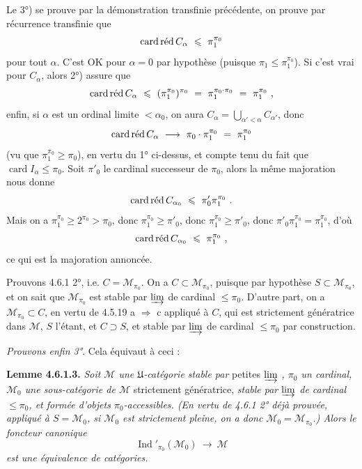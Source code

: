 \documentclass[11pt]{article}
\newcommand{\printedpage}[1]{\marginpar{\footnotesize p.~#1}}
\newcommand{\msp}[1]{\marginpar{\footnotesize [#1]}}
\newcommand{\Ind}{\operatorname{Ind}}
\newcommand{\cardred}{\mathop{\mathrm{card}\,\textup{réd}}\nolimits}
\begin{document}
Le 3°) se prouve par la démonstration transfinie précédente, on prouve par récurrence transfinie que
\[
\cardred C_\alpha \ \leqslant\ \pi_1^{\pi_0}
\]
pour tout $\alpha$. C'est OK pour $\alpha=0$ par hypothèse (puisque $\pi_1\leqslant\pi_1^{\pi_0}$). Si c'est vrai pour $C_\alpha$, alors 2°) assure que
\[
\cardred C_\alpha \ \leqslant\ (\pi_1^{\pi_0})^{\pi_0} \ =\ \pi_1^{\pi_0\cdot\pi_0} \ =\ \pi_1^{\pi_0}\ , %
\]
enfin, si $\alpha$ est un ordinal limite $<\alpha_0$, on aura $C_\alpha=\bigcup_{\alpha'<\alpha}C_{\alpha'}$, donc
\[
\cardred C_\alpha \ \longrightarrow\ \pi_0\cdot\pi_1^{\pi_0} \ =\ \pi_1^{\pi_0} %
\]
(vu que $\pi_1^{\pi_0}\geqslant\pi_0$), en vertu du 1° ci-dessus, et compte tenu du fait que $\operatorname{card}I_\alpha\leqslant\pi_0$. Soit $\pi'_0$ le cardinal successeur de $\pi_0$, alors la même majoration nous donne
\[
\cardred C_{\alpha_0} \ \leqslant\ \pi'_0\pi_1^{\pi_0}\ .
\]
\printedpage{46}
Mais on a $\pi_1^{\pi_0}\geqslant2^{\pi_0}>\pi_0$, donc $\pi_1^{\pi_0}\geqslant\pi'_0$, donc $\pi_1^{\pi_0}\geqslant\pi'_0$, donc $\pi'_0\pi_1^{\pi_0}=\pi_1^{\pi_0}$, d'où
\[
\cardred C_{\alpha_0} \ \leqslant\ \pi_1^{\pi_0}\ ,
\]
ce qui est la majoration annoncée.

\msp{page 144}

Prouvons 4.6.1 2°, i.e. $C=\mathcal{M}_{\pi_0}$. On a $C\subset\mathcal{M}_{\pi_0}$, puisque par hypothèse $S\subset\mathcal{M}_{\pi_0}$, et on sait que $\mathcal{M}_{\pi_0}$ est stable par $\varinjlim$ de cardinal $\leqslant\pi_0$. D'autre part, on a $\mathcal{M}_{\pi_0}\subset C$, en vertu de 4.5.19 a $\Longrightarrow$ c appliqué à $C$, qui est strictement génératrice dans $\mathcal{M}$, $S$ l'étant, et $C\supset S$, et stable par $\varinjlim$ de cardinal $\leqslant\pi_0$ par construction.

\textit{Prouvons enfin 3°}. Cela équivaut à ceci :

\textbf{Lemme 4.6.1.3.} \textit{Soit $\mathcal{M}$ une $\mathfrak{U}$-catégorie stable par} petites \textit{$\varinjlim$ , $\pi_0$ un cardinal, $\mathcal{M}_0$ une sous-catégorie de $\mathcal{M}$} strictement génératrice, \textit{stable par $\varinjlim$ de cardinal $\leqslant\pi_0$, et formée d'objets $\pi_0$-accessibles. (En vertu de 4.6.1 2° déjà prouvée, appliqué à $S=\mathcal{M}_0$, si $\mathcal{M}_0$ est strictement pleine, on a donc $\mathcal{M}_0=\mathcal{M}_{\pi_0}$.) Alors le foncteur canonique}
\[
\Ind'_{\pi_0}(\mathcal{M}_0) \ \longrightarrow\ \mathcal{M}
\]
\textit{est une équivalence de catégories.}
\end{document}
